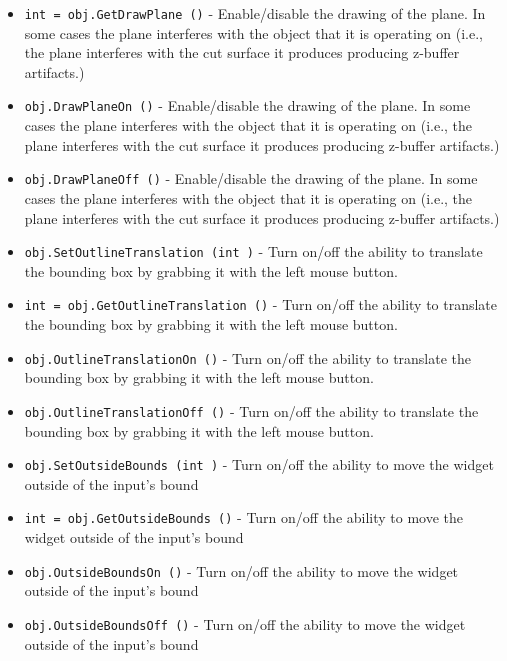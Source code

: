 \begin{itemize}
\item  \verb|int = obj.GetDrawPlane ()| -  Enable/disable the drawing of the plane. In some cases the plane
 interferes with the object that it is operating on (i.e., the
 plane interferes with the cut surface it produces producing
 z-buffer artifacts.)

\item  \verb|obj.DrawPlaneOn ()| -  Enable/disable the drawing of the plane. In some cases the plane
 interferes with the object that it is operating on (i.e., the
 plane interferes with the cut surface it produces producing
 z-buffer artifacts.)

\item  \verb|obj.DrawPlaneOff ()| -  Enable/disable the drawing of the plane. In some cases the plane
 interferes with the object that it is operating on (i.e., the
 plane interferes with the cut surface it produces producing
 z-buffer artifacts.)

\item  \verb|obj.SetOutlineTranslation (int )| -  Turn on/off the ability to translate the bounding box by grabbing it
 with the left mouse button.

\item  \verb|int = obj.GetOutlineTranslation ()| -  Turn on/off the ability to translate the bounding box by grabbing it
 with the left mouse button.

\item  \verb|obj.OutlineTranslationOn ()| -  Turn on/off the ability to translate the bounding box by grabbing it
 with the left mouse button.

\item  \verb|obj.OutlineTranslationOff ()| -  Turn on/off the ability to translate the bounding box by grabbing it
 with the left mouse button.

\item  \verb|obj.SetOutsideBounds (int )| -  Turn on/off the ability to move the widget outside of the input's bound

\item  \verb|int = obj.GetOutsideBounds ()| -  Turn on/off the ability to move the widget outside of the input's bound

\item  \verb|obj.OutsideBoundsOn ()| -  Turn on/off the ability to move the widget outside of the input's bound

\item  \verb|obj.OutsideBoundsOff ()| -  Turn on/off the ability to move the widget outside of the input's bound


\end{itemize}
